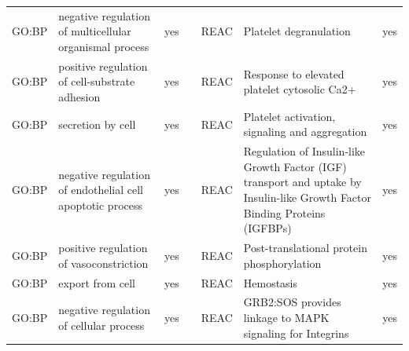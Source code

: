 \begin{longtable}{@{}lp{4cm}lllp{4cm}l@{}}
GO:BP           & negative regulation of multicellular organismal process                                                                            & yes              &           & REAC            & Platelet degranulation                                                                                                                                                 & yes              \\
GO:BP           & positive regulation of cell-substrate adhesion                                                                                     & yes              &           & REAC            & Response to elevated platelet cytosolic Ca2+                                                                                                                           & yes              \\
GO:BP           & secretion by cell                                                                                                                  & yes              &           & REAC            & Platelet activation, signaling and aggregation                                                                                                                         & yes              \\
GO:BP           & negative regulation of endothelial cell apoptotic process                                                                          & yes              &           & REAC            & Regulation of Insulin-like Growth Factor (IGF) transport and uptake by Insulin-like Growth Factor Binding Proteins (IGFBPs) & yes              \\
GO:BP           & positive regulation of vasoconstriction                                                                                            & yes              &           & REAC            & Post-translational protein phosphorylation                                                                                                                             & yes              \\
GO:BP           & export from cell                                                                                                                   & yes              &           & REAC            & Hemostasis                                                                                                                                                             & yes              \\
GO:BP           & negative regulation of cellular process                                                                                            & yes              &           & REAC            & GRB2:SOS provides linkage to MAPK signaling for Integrins                                                                                                              & yes              \\

\end{longtable}
